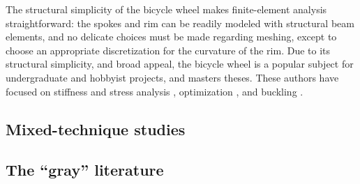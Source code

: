 \documentclass[../thesis.tex]{subfiles}
\begin{document}
The structural simplicity of the bicycle wheel makes finite-element analysis straightforward: the spokes and rim can be readily modeled with structural beam elements, and no delicate choices must be made regarding meshing, except to choose an appropriate discretization for the curvature of the rim. Due to its structural simplicity, and broad appeal, the bicycle wheel is a popular subject for undergraduate and hobbyist projects, and masters theses. These authors have focused on stiffness and stress analysis \cite{Ng,Hartz}, optimization \cite{Keller,Svensson}, and buckling \cite{Kern}.

\subsection{Mixed-technique studies}

\subsection{The ``gray'' literature}
\end{document}
